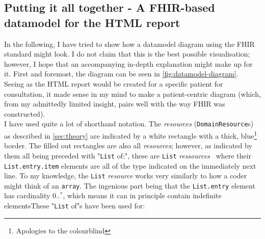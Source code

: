 \subsection{Putting it all together - A FHIR-based datamodel for the HTML report}
In the following, I have tried to show how a datamodel diagram using the FHIR standard might look. I do not claim that this is the best possible visualisation; however, I hope that an accompanying in-depth explanation might make up for it.  First and foremost, the diagram can be seen in \autoref{fig:datamodel-diagram}.
\\
Seeing as the HTML report would be created for a specific patient for consultation, it made sense in my mind to make a patient-centric diagram (which, from my admittedly limited insight, pairs well with the way FHIR was constructed).
\\
I have used quite a lot of shorthand notation. The \emph{resources} (\texttt{DomainResource}s) as described in \autoref{sec:theory} are indicated by a white rectangle with a thick, blue\footnote{Apologies to the colourblind} border. The filled out rectangles are also all \emph{resources}; however, as indicated by them all being preceded with "\texttt{List} of:", these are \texttt{List} \emph{ressources}~\cite{FHIR-List-resource} where their \texttt{List.entry.item} elements are all of the type indicated on the immediately next line. To my knowledge, the \texttt{List} \emph{resource} works very similarly to how a coder might think of an \texttt{array}. The ingenious part being that the \texttt{List.entry} element has cardinality $0..^\ast$, which means it can in principle contain indefinite elementsThese "\texttt{List} of"s have been used for:

